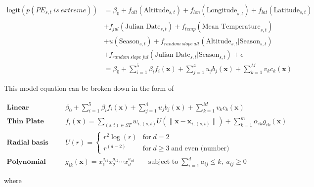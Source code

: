 \documentclass[
  12pt,
]{article}
\begin{document}
\begin{mdframed}[leftline = false, rightline = false, topline = true, bottomline = true, frametitle = {Generalized Additive Mixed Model - Model Equation}]
\begin{align}\label{eq:gamm_model_equation_appendix}
\text{logit}(p(PE_{s,t}\:is\:extreme)) &= \beta_{0} + f_{alt}(\text{Altitude}_{s,t}) + f_{lon}(\text{Longitude}_{s,t}) + f_{lat}(\text{Latitude}_{s,t}) \nonumber \\
&+ f_{jul}(\text{Julian Date}_{s,t}) + f_{temp}(\text{Mean Temperature}_{s,t}) \nonumber \\
&+ u(\text{Season}_{s,t}) + f_{random\:slope\:alt}(\text{Altitude}_{s,t} | \text{Season}_{s,t}) \nonumber \\ &+ f_{random\:slope\:jul}(\text{Julian Date}_{s,t} | \text{Season}_{s,t}) + \epsilon  \nonumber \\
&= \beta_0+\sum_{i = 1}^{5} \beta_i f_i(\boldsymbol{x}) + \sum_{j = 1}^{4} u_j b_j(\boldsymbol{x}) + \sum_{k = 1}^{M} v_k c_k(\boldsymbol{x})
\end{align}
\end{mdframed}

This model equation can be broken down in the form of

\begin{align}
\textbf{Linear Predictor} \qquad & \beta_0+\sum_{i = 1}^{5} \beta_i f_i(\boldsymbol{x}) + \sum_{j = 1}^{4} u_j b_j(\boldsymbol{x}) + \sum_{k = 1}^{M} v_k c_k(\boldsymbol{x})&\label{eq:gamm_eq} \\
\textbf{Thin Plate Regression Spline} \qquad &f_i(\boldsymbol{x}) = \sum_{(s,t)\in ST} w_{i,(s,t)} U(\lVert \boldsymbol{x} - \boldsymbol{x}_{i,(s,t)} \rVert) + \sum_{k = 1}^{m} \alpha_{ik} g_{ik}(\boldsymbol{x}) &\label{eq:tps_eq} \\
\textbf{Radial basis function} \qquad &U(r) = \begin{cases}
r^2 \log (r) & \text{for} \; d = 2 \\
r^{(d - 2)} & \text{for} \; d \geq 3 \; \text{and even (number)}
\end{cases} &\label{eq:rbf_eq} \\
\textbf{Polynomial basis functions} \qquad &g_{ik}(\boldsymbol{x}) = x_1^{a_{i1}} x_2^{a_{i2}} \cdots x_d^{a_{id}} \qquad \text{subject to} \; \sum_{i = 1}^{d} a_{ij} \leq k, \; a_{ij} \geq 0 &\label{eq:poly_eq}
\end{align}

where
\end{document}
